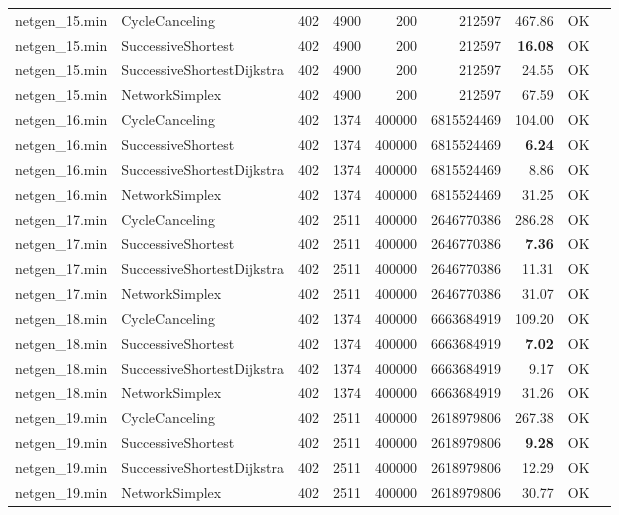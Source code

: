 \begin{longtable}{llrrrrrrl}
\midrule
netgen\_15.min & CycleCanceling & 402 & 4900 & 200 & 212597 & 467.86 & OK \\
netgen\_15.min & SuccessiveShortest & 402 & 4900 & 200 & 212597 & \textbf{16.08} & OK \\
netgen\_15.min & SuccessiveShortestDijkstra & 402 & 4900 & 200 & 212597 & 24.55 & OK \\
netgen\_15.min & NetworkSimplex & 402 & 4900 & 200 & 212597 & 67.59 & OK \\
\midrule
netgen\_16.min & CycleCanceling & 402 & 1374 & 400000 & 6815524469 & 104.00 & OK \\
netgen\_16.min & SuccessiveShortest & 402 & 1374 & 400000 & 6815524469 & \textbf{6.24} & OK \\
netgen\_16.min & SuccessiveShortestDijkstra & 402 & 1374 & 400000 & 6815524469 & 8.86 & OK \\
netgen\_16.min & NetworkSimplex & 402 & 1374 & 400000 & 6815524469 & 31.25 & OK \\
\midrule
netgen\_17.min & CycleCanceling & 402 & 2511 & 400000 & 2646770386 & 286.28 & OK \\
netgen\_17.min & SuccessiveShortest & 402 & 2511 & 400000 & 2646770386 & \textbf{7.36} & OK \\
netgen\_17.min & SuccessiveShortestDijkstra & 402 & 2511 & 400000 & 2646770386 & 11.31 & OK \\
netgen\_17.min & NetworkSimplex & 402 & 2511 & 400000 & 2646770386 & 31.07 & OK \\
\midrule
netgen\_18.min & CycleCanceling & 402 & 1374 & 400000 & 6663684919 & 109.20 & OK \\
netgen\_18.min & SuccessiveShortest & 402 & 1374 & 400000 & 6663684919 & \textbf{7.02} & OK \\
netgen\_18.min & SuccessiveShortestDijkstra & 402 & 1374 & 400000 & 6663684919 & 9.17 & OK \\
netgen\_18.min & NetworkSimplex & 402 & 1374 & 400000 & 6663684919 & 31.26 & OK \\
\midrule
netgen\_19.min & CycleCanceling & 402 & 2511 & 400000 & 2618979806 & 267.38 & OK \\
netgen\_19.min & SuccessiveShortest & 402 & 2511 & 400000 & 2618979806 & \textbf{9.28} & OK \\
netgen\_19.min & SuccessiveShortestDijkstra & 402 & 2511 & 400000 & 2618979806 & 12.29 & OK \\
netgen\_19.min & NetworkSimplex & 402 & 2511 & 400000 & 2618979806 & 30.77 & OK \\

\end{longtable}
